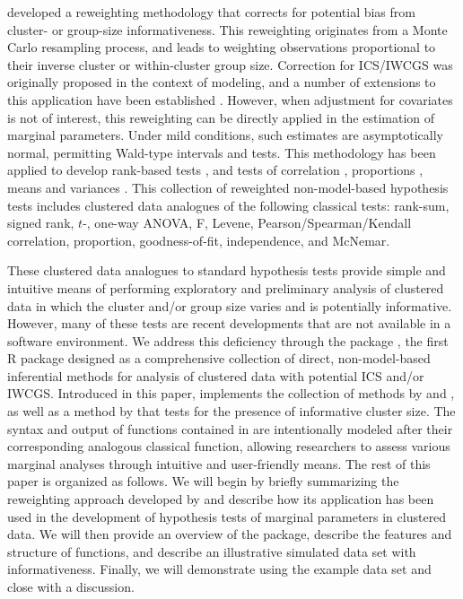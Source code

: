 \citet{williamson03} developed a reweighting methodology that corrects for potential bias from cluster- or group-size informativeness. This reweighting originates from a Monte Carlo resampling process, and leads to weighting observations proportional to their inverse cluster or within-cluster group size. Correction for ICS/IWCGS was originally proposed in the context of modeling, and a number of extensions to this application have been established \citep{bible16, iosif14, mitani19, mitani20}. However, when adjustment for covariates is not of interest, this reweighting can be directly applied in the estimation of marginal parameters. Under mild conditions, such estimates are asymptotically normal, permitting Wald-type intervals and tests. This methodology has been applied to develop rank-based tests \citep{datta05, datta08, dutta16}, and tests of correlation \citep{lorenz11}, proportions \citep{gregg20}, means and variances \citep{greggdis20}. This collection of reweighted non-model-based hypothesis tests includes clustered data analogues of the following classical tests: rank-sum, signed rank, $t$-, one-way ANOVA, F, Levene, Pearson/Spearman/Kendall correlation, proportion, goodness-of-fit, independence, and McNemar.

These clustered data analogues to standard hypothesis tests provide simple and intuitive means of performing exploratory and preliminary analysis of clustered data in which the cluster and/or group size varies and is potentially informative. However, many of these tests are recent developments that are not available in a software environment. We address this deficiency through the package , the first R package designed as a comprehensive collection of direct, non-model-based inferential methods for analysis of clustered data with potential ICS and/or IWCGS. Introduced in this paper,  implements the collection of methods by \citet{datta05, datta08, dutta16, lorenz11, gregg20} and \citet{greggdis20}, as well as a method by \citet{nevalainen17} that tests for the presence of informative cluster size. The syntax and output of functions contained in  are intentionally modeled after their corresponding analogous classical function, allowing researchers to assess various marginal analyses through intuitive and user-friendly means. The rest of this paper is organized as follows. We will begin by briefly summarizing the reweighting approach developed by \citet{williamson03} and describe how its application has been used in the development of hypothesis tests of marginal parameters in clustered data. We will then provide an overview of the  package, describe the features and structure of functions, and describe an illustrative simulated data set with informativeness. Finally, we will demonstrate  using the example data set and close with a discussion.

